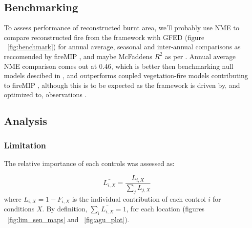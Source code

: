 \subsection{Benchmarking}
\begin{shaded}
To assess performance of reconstructed burnt area, we'll probably use NME to compare reconstructed fire from the framework with GFED (figure ~\ref{fig:benchmark}) for annual average, seasonal and inter-annual comparisons \citep{kelley2013comprehensive} as reccomended by fireMIP \citet{gmd-2016-237, hantson2016status}, and maybe McFaddens $R^{2}$ as per \citep{bistinas2014causal}. Annual average NME comparison comes out at 0.46, which is better then benchmarking null models descibed in \citet{kelley2013comprehensive}, and outperforms coupled vegetation-fire models contributing to fireMIP \citep{hantson2016status}, although this is to be expected as the framework is driven by, and optimized to, observations \citep{kelley2013comprehensive}.

\end{shaded}
\subsection{Analysis}


\subsubsection{Limitation}

The relative importance of each controls was assessed as:

\begin{equation}
    \bar{L_{i, X}} = \frac{L_{i, X}}{\sum_{j} L_{j, X}}
\end{equation}
where $L_{i, X} = 1 - F_{i,X}$ is the individual contribution of each control $i$ for conditions $X$. By definition, $\sum_{i} \bar{L_{i,X}} = 1$, for each location (figures ~\ref{fig:lim_sen_maps} and ~\ref{fig:agu_plot}).

